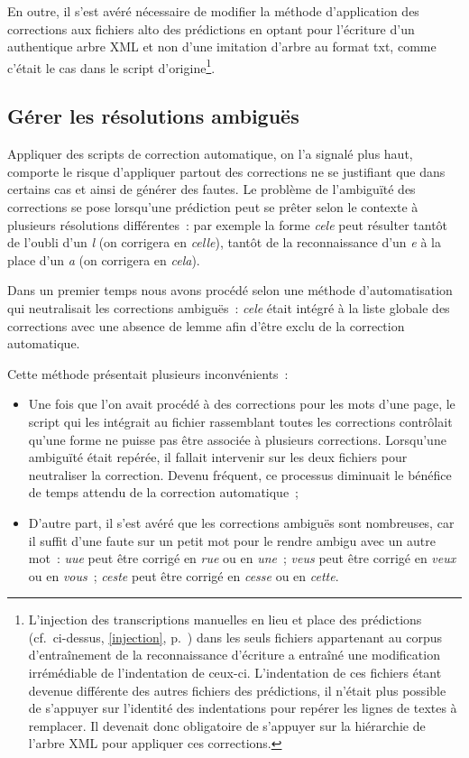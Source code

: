 \documentclass[a4paper,12pt,twoside]{book}
\begin{document}
				En outre, il s'est avéré nécessaire de modifier la méthode d'application des corrections aux fichiers \gls{alto} des prédictions en optant pour l'écriture d'un authentique arbre XML et non d'une imitation d'arbre au format \textsf{txt}, comme c'était le cas dans le script d'origine\footnote{L'injection des transcriptions manuelles en lieu et place des prédictions (cf.~ci-dessus, \ref{injection}, p.~\pageref{injection}) dans les seuls fichiers appartenant au corpus d'entraînement de la reconnaissance d'écriture a entraîné une modification irrémédiable de l'indentation de ceux-ci. L'indentation de ces fichiers étant devenue différente des autres fichiers des prédictions, il n'était plus possible de s'appuyer sur l'identité des indentations pour repérer les lignes de textes à remplacer. Il devenait donc obligatoire de s'appuyer sur la hiérarchie de l'arbre XML pour appliquer ces corrections.}.
								
			\subsection{Gérer les résolutions ambiguës}
				Appliquer des scripts de correction automatique, on l'a signalé plus haut, comporte le risque d'appliquer partout des corrections ne se justifiant que dans certains cas et ainsi de générer des fautes. Le problème de l'ambiguïté des corrections se pose lorsqu'une prédiction peut se prêter selon le contexte à plusieurs résolutions différentes~: par exemple la forme \textit{cele} peut résulter tantôt de l'oubli d'un \textit{l} (on corrigera en \textit{celle}), tantôt de la reconnaissance d'un \textit{e} à la place d'un \textit{a} (on corrigera en \textit{cela}).
							
				Dans un premier temps nous avons procédé selon une méthode d'automatisation qui neutralisait les corrections ambiguës~: \textit{cele} était intégré à la liste globale des corrections avec une absence de lemme afin d'être exclu de la correction automatique.
				
				Cette méthode présentait plusieurs inconvénients~:

				\begin{itemize}
					\item Une fois que l'on avait procédé à des corrections pour les mots d'une page, le script qui les intégrait au fichier rassemblant toutes les corrections contrôlait qu'une forme ne puisse pas être associée à plusieurs corrections. Lorsqu'une ambiguïté était repérée, il fallait intervenir sur les deux fichiers pour neutraliser la correction. Devenu fréquent, ce processus diminuait le bénéfice de temps attendu de la correction automatique~;

					\item D'autre part, il s'est avéré que les corrections ambiguës sont nombreuses, car il suffit d'une faute sur un petit mot pour le rendre ambigu avec un autre mot~: \textit{uue} peut être corrigé en \textit{rue} ou en \textit{une}~; \textit{veus} peut être corrigé en \textit{veux} ou en \textit{vous}~; \textit{ceste} peut être corrigé en \textit{cesse} ou en \textit{cette}.
				
				\end{itemize}
				
\end{document}
